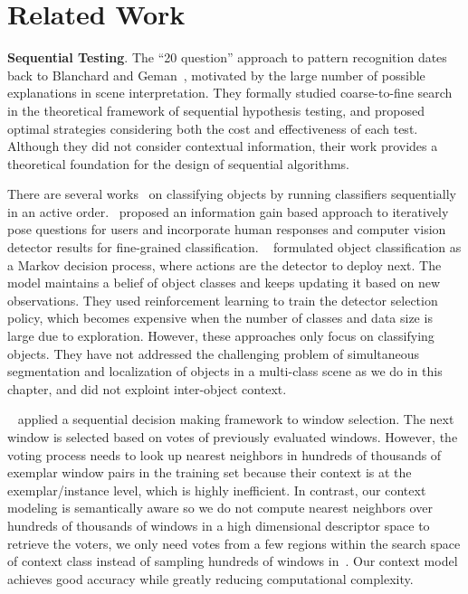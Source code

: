 \section{Related Work}
\label{sec:relatedwork}

{\bf{Sequential Testing}}. 
The ``20 question'' approach to pattern recognition dates back to Blanchard and Geman~\cite{blanchard2005hierarchical}, motivated by the large number of possible explanations in scene interpretation. They formally studied coarse-to-fine search in the theoretical framework of sequential hypothesis testing, and proposed optimal strategies considering both the cost and effectiveness of each test. Although they did not consider contextual information, their work provides a theoretical foundation for the design of sequential algorithms.

There are several works~\cite{gao2011active} on classifying objects by running classifiers sequentially in an active order.~\cite{branson2010visual} proposed an information gain based approach to iteratively pose questions for users and incorporate human responses and computer vision detector results for fine-grained classification.
~\cite{sergey2012timely} formulated object classification as a Markov decision process, 
where actions are the detector to deploy next. 
The model maintains a belief of object classes and keeps updating it based on new observations.  
They used reinforcement learning to train the detector selection policy, 
which becomes expensive when the number of classes and data size is large due to exploration. However, these approaches only focus on classifying objects. They have not addressed the challenging problem of simultaneous segmentation and localization of objects in a multi-class scene as we do in this chapter, and did not exploint inter-object context.

~\cite{bogdan2012context} applied a sequential decision making framework to window selection. The next window is selected based on votes of previously evaluated windows. However, the voting process needs to look up nearest neighbors in hundreds of thousands of exemplar window pairs in the training set because their context is at the exemplar/instance level, which is highly inefficient. In contrast, our context modeling is semantically aware so we do not compute nearest neighbors over hundreds of thousands of windows in a high dimensional descriptor space to retrieve the voters, we only need votes from a few regions within the search space of context class instead of sampling hundreds of windows in~\cite{bogdan2012context}. Our context model achieves good accuracy while greatly reducing computational complexity.

